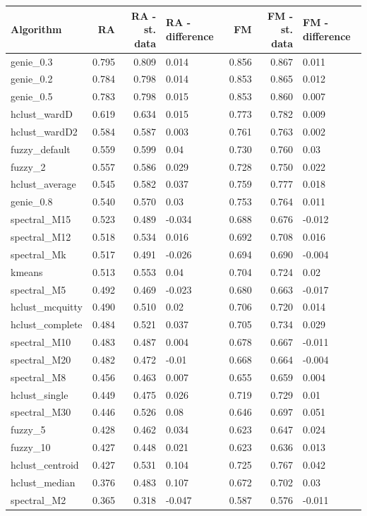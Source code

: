 \documentclass[]{article}
\begin{document}
\begin{longtable}[]{@{}lrrlrrl@{}}
\toprule
Algorithm & RA & RA - st. data & RA - difference & FM & FM - st. data &
FM - difference\tabularnewline
\midrule
\endhead
genie\_0.3 & 0.795 & 0.809 & {0.014} & 0.856 & 0.867 &
{0.011}\tabularnewline
genie\_0.2 & 0.784 & 0.798 & {0.014} & 0.853 & 0.865 &
{0.012}\tabularnewline
genie\_0.5 & 0.783 & 0.798 & {0.015} & 0.853 & 0.860 &
{0.007}\tabularnewline
hclust\_wardD & 0.619 & 0.634 & {0.015} & 0.773 & 0.782 &
{0.009}\tabularnewline
hclust\_wardD2 & 0.584 & 0.587 & {0.003} & 0.761 & 0.763 &
{0.002}\tabularnewline
fuzzy\_default & 0.559 & 0.599 & {0.04} & 0.730 & 0.760 &
{0.03}\tabularnewline
fuzzy\_2 & 0.557 & 0.586 & {0.029} & 0.728 & 0.750 &
{0.022}\tabularnewline
hclust\_average & 0.545 & 0.582 & {0.037} & 0.759 & 0.777 &
{0.018}\tabularnewline
genie\_0.8 & 0.540 & 0.570 & {0.03} & 0.753 & 0.764 &
{0.011}\tabularnewline
spectral\_M15 & 0.523 & 0.489 & {-0.034} & 0.688 & 0.676 &
{-0.012}\tabularnewline
spectral\_M12 & 0.518 & 0.534 & {0.016} & 0.692 & 0.708 &
{0.016}\tabularnewline
spectral\_Mk & 0.517 & 0.491 & {-0.026} & 0.694 & 0.690 &
{-0.004}\tabularnewline
kmeans & 0.513 & 0.553 & {0.04} & 0.704 & 0.724 & {0.02}\tabularnewline
spectral\_M5 & 0.492 & 0.469 & {-0.023} & 0.680 & 0.663 &
{-0.017}\tabularnewline
hclust\_mcquitty & 0.490 & 0.510 & {0.02} & 0.706 & 0.720 &
{0.014}\tabularnewline
hclust\_complete & 0.484 & 0.521 & {0.037} & 0.705 & 0.734 &
{0.029}\tabularnewline
spectral\_M10 & 0.483 & 0.487 & {0.004} & 0.678 & 0.667 &
{-0.011}\tabularnewline
spectral\_M20 & 0.482 & 0.472 & {-0.01} & 0.668 & 0.664 &
{-0.004}\tabularnewline
spectral\_M8 & 0.456 & 0.463 & {0.007} & 0.655 & 0.659 &
{0.004}\tabularnewline
hclust\_single & 0.449 & 0.475 & {0.026} & 0.719 & 0.729 &
{0.01}\tabularnewline
spectral\_M30 & 0.446 & 0.526 & {0.08} & 0.646 & 0.697 &
{0.051}\tabularnewline
fuzzy\_5 & 0.428 & 0.462 & {0.034} & 0.623 & 0.647 &
{0.024}\tabularnewline
fuzzy\_10 & 0.427 & 0.448 & {0.021} & 0.623 & 0.636 &
{0.013}\tabularnewline
hclust\_centroid & 0.427 & 0.531 & {0.104} & 0.725 & 0.767 &
{0.042}\tabularnewline
hclust\_median & 0.376 & 0.483 & {0.107} & 0.672 & 0.702 &
{0.03}\tabularnewline
spectral\_M2 & 0.365 & 0.318 & {-0.047} & 0.587 & 0.576 &
{-0.011}\tabularnewline
\bottomrule
\end{longtable}
\end{document}
